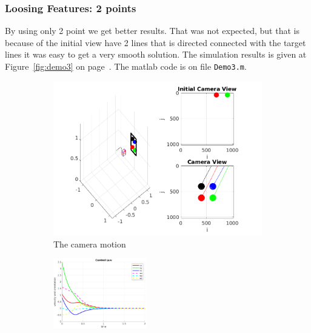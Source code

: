 \documentclass[a4paper,12pt]{article}
\begin{document}
\subsubsection{Loosing Features: 2 points}
By using only 2 point we get better results. That was not expected, but that is because of the 
initial view have 2 lines that is directed connected with the target lines it was easy to get a 
very smooth solution.  The simulation results is given at Figure~\ref{fig:demo3} on page~\pageref{fig:demo3}.  The matlab code is on file \texttt{Demo3.m}.
\begin{figure}[tb!]
                 \begin{subfigure}[b]{\textwidth}         
                \centering
                 \includegraphics[width=13cm]{../results/Demo3-simulation.png}
             \caption{The camera motion}
             \vspace{8pt}
                 \end{subfigure}
         \begin{subfigure}[b]{0.32\textwidth}
                \centering
                \includegraphics[height=1.2in]{../results/Demo3-control-law.png}
                 \end{subfigure}
         \begin{subfigure}[b]{0.2\textwidth}

\end{subfigure}
\end{figure}
\end{document}
